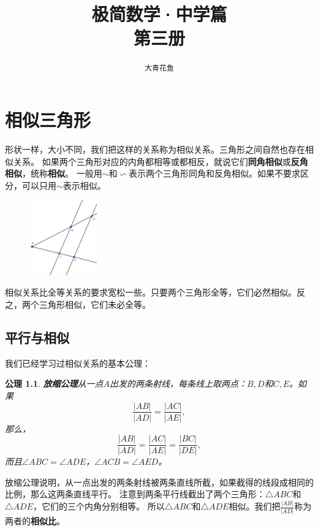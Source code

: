 \documentclass[12pt,UTF8]{ctexbook}
\title{\zihao{0} \bfseries 极简数学·中学篇 \\ 第三册}
\author{\zihao{2} \texttt{大青花鱼}}
\date{}
\newtheorem{po}{公理}
\begin{document}
\maketitle
\tableofcontents
\newpage

\chapter{相似三角形}
形状一样，大小不同，我们把这样的关系称为相似关系。三角形之间自然也存在相似关系。
如果两个三角形对应的内角都相等或都相反，就说它们\textbf{同角相似}或\textbf{反角相似}，统称\textbf{相似}。
一般用$\sim$和$\backsim$表示两个三角形同角和反角相似。如果不要求区分，可以只用$\sim$表示相似。

\begin{figure} %
    \vspace{-26pt}
    \includegraphics[width=0.26\textwidth]{比例1.png}
\end{figure}

相似关系比全等关系的要求宽松一些。只要两个三角形全等，它们必然相似。反之，两个三角形相似，它们未必全等。

\section{平行与相似}
我们已经学习过相似关系的基本公理：
\begin{po}{\textbf{放缩公理}}\label{po:6}
    从一点$A$出发的两条射线，每条线上取两点：$B,D$和$C,E$。如果
    $$ \frac{|AB|}{|AD|} = \frac{|AC|}{|AE|},$$
    那么，
    $$ \frac{|AB|}{|AD|} = \frac{|AC|}{|AE|} = \frac{|BC|}{|DE|},$$
    而且$\angle ABC = \angle ADE$，$\angle ACB = \angle AED$。
\end{po}

放缩公理说明，从一点出发的两条射线被两条直线所截，如果截得的线段成相同的比例，那么这两条直线平行。
注意到两条平行线截出了两个三角形：$\triangle ABC$和$\triangle ADE$，它们的三个内角分别相等。
所以$\triangle ABC$和$\triangle ADE$相似。我们把$\frac{|AB|}{|AD|}$称为两者的\textbf{相似比}。

\end{document}
